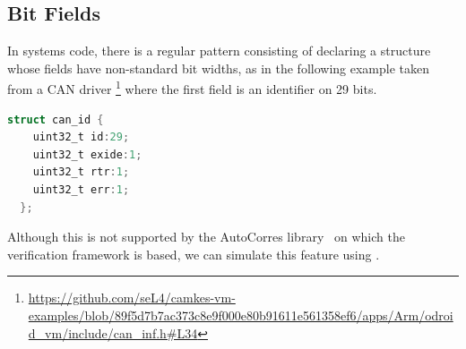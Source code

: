 


\subsection{Bit Fields}\label{ssec:bitfields}

In systems code, there is a regular pattern consisting of declaring a structure whose fields have non-standard
 bit widths, as in the following example taken from a CAN driver%
 \footnote{\url{https://github.com/seL4/camkes-vm-examples/blob/89f5d7b7ac373c8e9f000e80b91611e561358ef6/apps/Arm/odroid_vm/include/can_inf.h\#L34}}
 where the first field is an identifier on 29 bits.
\begin{lstlisting}[language=C]
  struct can_id {
    uint32_t id:29;
    uint32_t exide:1;
    uint32_t rtr:1;
    uint32_t err:1;
  };
\end{lstlisting}
Although this is not supported by the AutoCorres library~\citep{autocorres} on which the \cogent
verification framework is based, we can simulate this feature using \Dargent.


